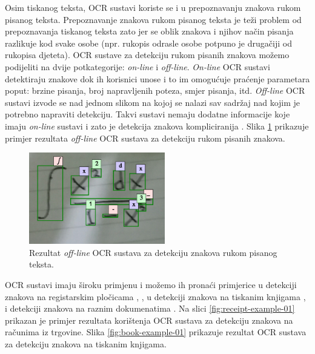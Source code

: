 \documentclass[times, utf8, zavrsni]{fer}
\begin{document}
Osim tiskanog teksta, OCR sustavi koriste se i u prepoznavanju znakova rukom pisanog teksta.
Prepoznavanje znakova rukom pisanog teksta je teži problem od prepoznavanja tiskanog teksta \citep{DBLP:journals/corr/abs-1710-05703} zato jer
se oblik znakova i njihov način pisanja razlikuje kod svake osobe (npr. rukopis odrasle osobe potpuno je drugačiji od
rukopisa djeteta).
OCR sustave za detekciju rukom pisanih znakova možemo podijeliti na dvije potkategorije:
\emph{on-line} i \emph{off-line}. \emph{On-line} OCR sustavi detektiraju znakove dok
ih korisnici unose i to im omogućuje praćenje parametara poput: brzine pisanja, broj napravljenih poteza,
smjer pisanja, itd. \emph{Off-line} OCR sustavi izvode se nad jednom slikom na kojoj se nalazi
sav sadržaj nad kojim je potrebno napraviti detekciju. Takvi sustavi nemaju dodatne informacije koje imaju
\emph{on-line} sustavi i zato je detekcija znakova kompliciranija \citep{DBLP:journals/corr/abs-1710-05703}. Slika \ref{fig:math-example-01} prikazuje primjer rezultata
\emph{off-line} OCR sustava za detekciju rukom pisanih znakova.

\begin{figure}[htb]
    \centering
    \captionsetup{justification=centering,margin=2cm}
    \includegraphics[height=4cm]{images/math-example-01.png}
    \caption{Rezultat \emph{off-line} OCR sustava za detekciju znakova rukom pisanog teksta.}
    \label{fig:math-example-01}
\end{figure}

\pagebreak

OCR sustavi imaju široku primjenu i možemo ih pronaći primjerice u detekciji
znakova na registarskim pločicama \citep{DBLP:journals/corr/Saghaei16a}, \citep{DBLP:journals/corr/abs-1802-09567},
u detekciji znakova na tiskanim knjigama \citep{DBLP:journals/corr/abs-1802-10033},
\citep{Christy:2017:MDE:3172938.3075645} i
detekciji znakova na raznim dokumenatima \citep{DBLP:journals/corr/HarrajR15} \citep{verma2016ocr}. Na slici \ref{fig:receipt-example-01}
prikazan je primjer rezultata korištenja OCR sustava za detekciju znakova na računima iz trgovine.
Slika \ref{fig:book-example-01} prikazuje rezultat OCR sustava za detekciju znakova na tiskanim knjigama.
\end{document}
